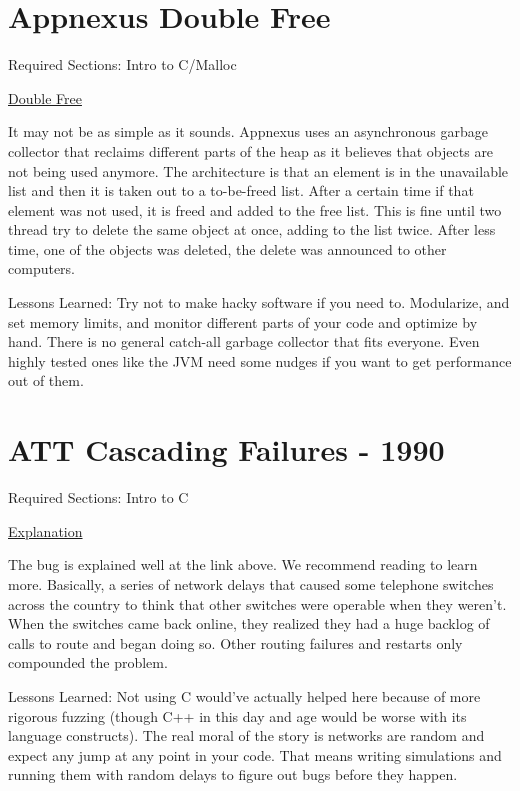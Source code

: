 \section{Appnexus Double Free}

Required Sections: Intro to C/Malloc

\href{https://techblog.appnexus.com/2013-09-17-outage-postmortem-586b19ae4307}{Double Free}

It may not be as simple as it sounds.
Appnexus uses an asynchronous garbage collector that reclaims different parts of the heap as it believes that objects are not being used anymore.
The architecture is that an element is in the unavailable list and then it is taken out to a to-be-freed list.
After a certain time if that element was not used, it is freed and added to the free list.
This is fine until two thread try to delete the same object at once, adding to the list twice. After less time, one of the objects was deleted, the delete was announced to other computers.

Lessons Learned: Try not to make hacky software if you need to. Modularize, and set memory limits, and monitor different parts of your code and optimize by hand. There is no general catch-all garbage collector that fits everyone. Even highly tested ones like the JVM need some nudges if you want to get performance out of them.

\section{ATT Cascading Failures - 1990}

Required Sections: Intro to C

\href{http://users.csc.calpoly.edu/~jdalbey/SWE/Papers/att_collapse.html}{Explanation}

The bug is explained well at the link above.
We recommend reading to learn more.
Basically, a series of network delays that caused some telephone switches across the country to think that other switches were operable when they weren't.
When the switches came back online, they realized they had a huge backlog of calls to route and began doing so.
Other routing failures and restarts only compounded the problem.

Lessons Learned: Not using C would've actually helped here because of more rigorous fuzzing (though C++ in this day and age would be worse with its language constructs).
The real moral of the story is networks are random and expect any jump at any point in your code.
That means writing simulations and running them with random delays to figure out bugs before they happen.
